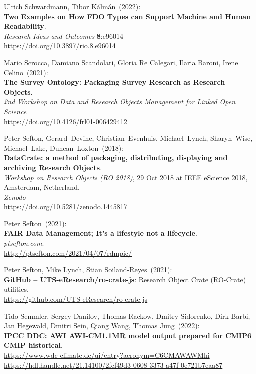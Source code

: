 \begin{thebibliography}{9}
Ulrich Schwardmann, Tibor Kálmán~(2022): \\
\textbf{Two {Examples} on {How FDO Types} can {Support Machine} and {Human Readability}}.\\
\emph{Research Ideas and Outcomes} \textbf{8}:e96014 \\
\url{https://doi.org/10.3897/rio.8.e96014}

Mario Scrocca, Damiano Scandolari, Gloria Re Calegari, Ilaria Baroni, Irene Celino~(2021): \\
\textbf{The Survey Ontology: Packaging Survey Research as Research Objects}.\\
\emph{2nd Workshop on Data and Research Objects Management for Linked Open Science}\\
\url{https://doi.org/10.4126/frl01-006429412}

Peter Sefton, Gerard~Devine, Christian~Evenhuis, Michael~Lynch, Sharyn~Wise, Michael~Lake, Duncan~Loxton~(2018): \\
\textbf{DataCrate: a method of packaging, distributing, displaying and archiving Research Objects}.\\
\emph{Workshop on Research Objects (RO 2018)}, 29 Oct 2018 at IEEE eScience 2018, Amsterdam, Netherland. \\
\emph{Zenodo}\\
\url{https://doi.org/10.5281/zenodo.1445817}

Peter Sefton~(2021): \\
\textbf{FAIR Data Management; It's a lifestyle not a lifecycle}.\\
\emph{ptsefton.com}. \\
\url{http://ptsefton.com/2021/04/07/rdmpic/}

Peter Sefton, Mike Lynch, Stian Soiland-Reyes~(2021): \\
\textbf{GitHub -- UTS-eResearch/ro-crate-js}: Research Object Crate (RO-Crate) utilities.\\
\url{https://github.com/UTS-eResearch/ro-crate-js}

Tido Semmler, Sergey Danilov, Thomas Rackow, Dmitry Sidorenko, Dirk Barbi, Jan Hegewald, Dmitri Sein, Qiang Wang, Thomas Jung~(2022): \\
\textbf{IPCC DDC: AWI AWI-CM1.1MR model output prepared for CMIP6 CMIP historical}. \\
\url{https://www.wdc-climate.de/ui/entry?acronym=C6CMAWAWMhi}\\
\url{https://hdl.handle.net/21.14100/2fcf49d3-0608-3373-a47f-0e721b7eaa87}


\end{thebibliography}
